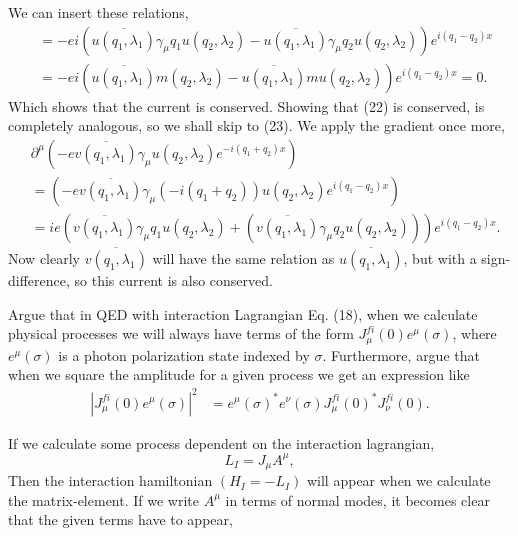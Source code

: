 \documentclass[working, oneside]{../../../Preambles/tuftebook}
\begin{document}
We can insert these relations,
\begin{align*}
  &=  -ei \left(\overline{u\left( q_1, \lambda_1 \right) }\gamma_{\mu }q_1 u\left( q_2, \lambda_2 \right) - \overline{u\left( q_1, \lambda_1 \right) }\gamma_{\mu }q_2 u\left( q_2, \lambda_2 \right)\right)e^{i\left( q_1-q_2 \right) x} \\
  &=-ei \left(\overline{u\left( q_1, \lambda_1 \right) }m\left( q_2, \lambda_2 \right) - \overline{u\left( q_1, \lambda_1 \right) }m u\left( q_2, \lambda_2 \right)\right)e^{i\left( q_1-q_2 \right) x} = 0
.\end{align*}
Which shows that the current is conserved. Showing that (22) is conserved, is completely analogous, so we shall skip to (23). We apply the gradient once more,
\begin{align*}
    &\partial^{\mu }\left(   -e \overline{v\left( q_1, \lambda_1 \right) }\gamma_{\mu } u\left( q_2, \lambda_2 \right) e^{-i\left( q_1+q_2 \right) x} \right) \\
    &= \left(   -e \overline{v\left( q_1, \lambda_1 \right) }\gamma_{\mu } (-i\left(q_1 + q_2  \right) ) u\left( q_2, \lambda_2 \right) e^{i\left( q_1-q_2 \right) x} \right)  \\
      &= ie \left(\overline{v\left( q_1, \lambda_1 \right) }\gamma_{\mu }q_1u\left( q_2, \lambda_2 \right)+ \left(\overline{v\left( q_1, \lambda_1 \right) }\gamma_{\mu }q_2u\left( q_2, \lambda_2 \right) \right) \right)e^{i\left( q_1-q_2 \right) x}  
.\end{align*}
Now clearly $\overline{v\left( q_1, \lambda_1 \right) }$ will have the same relation as $\overline{u\left( q_1, \lambda_1 \right) }$, but with a sign-difference, so this current is also conserved.
\begin{exercise}[7]
Argue that in QED with interaction Lagrangian Eq. (18), when we calculate physical processes we will always have terms of the form \( J_\mu^{fi}(0) e^\mu(\sigma) \), where \( e^\mu(\sigma) \) is a photon polarization state indexed by \( \sigma \). Furthermore, argue that when we square the amplitude for a given process we get an expression like
\begin{align*}
| J_\mu^{fi}(0) e^\mu(\sigma) |^2
&= e^{\mu}(\sigma)^* e^{\nu}(\sigma) J_{\mu}^{fi}(0)^* J_{\nu}^{fi}(0). \tag{25}
\end{align*}
\end{exercise}
If we calculate some process dependent on the interaction lagrangian,
\[
    L_{I} = J_{\mu }A^{\mu }
,\] 
Then the interaction hamiltonian $(H_I = -L_I)$ will appear when we calculate the matrix-element. If we write $A^{\mu }$ in terms of normal modes, it becomes clear that the given terms have to appear,
\end{document}
